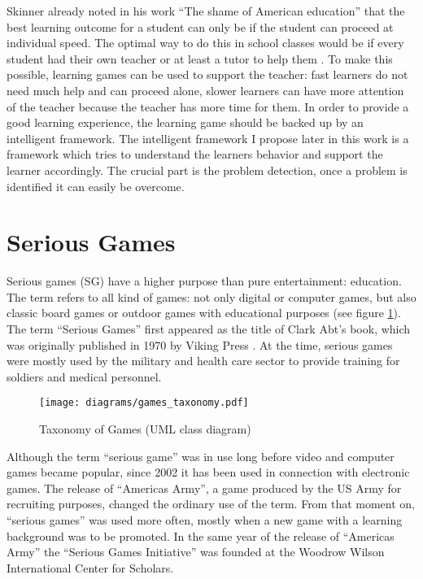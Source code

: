 Skinner already noted in his work ``The shame of American education''
\cite{Skinner1984a} that the
best learning outcome for a student can only be if the student
can proceed at individual speed. The optimal way to do this in school
classes would be if every student had their own teacher or at least
a tutor to help them \cite{Skinner1984a}. To make this possible, learning
games can be used to support the teacher: fast learners do not need
much help and can proceed alone, slower learners can have more
attention of the teacher because the teacher has more time for them.
In order to provide a good learning experience, the learning game should be
backed up by an intelligent framework. The intelligent framework I propose
later in this work is a framework which tries to understand the learners
behavior and support the learner accordingly. The crucial part is the problem
detection, once a problem is identified it can easily be overcome.


\section{Serious Games}

Serious games (SG) have a higher purpose than pure entertainment: education. The term
refers to all kind of games: not only digital or computer games, but also
classic board games or outdoor games with educational purposes (see figure
\ref{taxonomy_games}). The term
``Serious Games'' first appeared as the title of Clark Abt's book,
which was originally published in 1970 by Viking Press \cite{Abt1987}. At the
time, serious games were mostly used by the military and health care sector to
provide training for soldiers and medical personnel.

\begin{figure}
    \centering
    \texttt{[image: diagrams/games\_taxonomy.pdf]}
    \caption[Taxonomy of Games (UML class diagram)]
    {Taxonomy of Games (UML class diagram)}
    \label{taxonomy_games}
\end{figure}

Although the term ``serious game'' was in use long before video and computer games
became popular, since 2002 it has been used in connection with electronic
games. The release of ``Americas Army'', a game produced by the US
Army for recruiting purposes, changed the ordinary use of the term. From that
moment on, ``serious games'' was used more often, mostly when a new game with a
learning background was to be promoted. In the same year of the release of
``Americas Army'' the ``Serious Games Initiative'' was
founded at the Woodrow Wilson International Center for Scholars.

